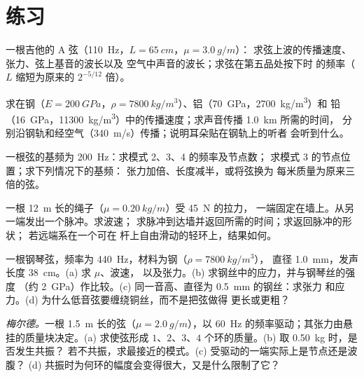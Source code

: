 \section{练习}

\begin{exercise}[$\star$]\label{exo:b2:waves-on-strings:1}
一根吉他的 A 弦（\qty{110}{Hz}，$L = \qty{65}{cm}$，$\mu = \qty{3.0}{g/m}$）：
求弦上波的传播速度、张力、弦上基音的波长以及
空气中声音的波长；求弦在第五品处按下时
的频率（$L$ 缩短为原来的 $2^{-5/12}$ 倍）。
\end{exercise}

\begin{exercise}[$\star$]\label{exo:b2:waves-on-strings:2}
求在钢（$E = \qty{200}{GPa}$，$\rho =
\qty{7800}{kg/m^3}$）、铝（\qty{70}{GPa}，\qty{2700}{kg/m^3}）和
铅（\qty{16}{GPa}，\qty{11300}{kg/m^3}）中的传播速度；求声音传播 \qty{1.0}{km} 所需的时间，
分别沿钢轨和经空气（\qty{340}{m/s}）传播；说明耳朵贴在钢轨上的听者
会听到什么。
\end{exercise}

\begin{exercise}[$\star$]\label{exo:b2:waves-on-strings:3}
一根弦的基频为 \qty{200}{Hz}：求模式 2、3、4 的频率及节点数；
求模式 3 的节点位置；求下列情况下的基频：
张力加倍、长度减半，或将弦换为
每米质量为原来三倍的弦。
\end{exercise}

\begin{exercise}[$\star$]\label{exo:b2:waves-on-strings:4}
一根 \qty{12}{m} 长的绳子（$\mu = \qty{0.20}{kg/m}$）受 \qty{45}{N} 的拉力，
一端固定在墙上。从另一端发出一个脉冲。求波速；
求脉冲到达墙并返回所需的时间；求返回脉冲的形状；
若远端系在一个可在
杆上自由滑动的轻环上，结果如何。
\end{exercise}

\begin{exercise}[$\star\star$]\label{exo:b2:waves-on-strings:5}
一根钢琴弦，频率为 \qty{440}{Hz}，材料为钢（$\rho = \qty{7800}{kg/m^3}$），
直径 \qty{1.0}{mm}，发声长度 \qty{38}{cm}。(a) 求 $\mu$、波速，
以及张力。(b) 求钢丝中的应力，并与钢琴丝的强度
（约 \qty{2}{GPa}）作比较。(c) 同一音高、直径为 \qty{0.5}{mm} 的钢丝：求张力
和应力。(d) 为什么低音弦要缠绕铜丝，而不是把弦做得
更长或更粗？
\end{exercise}

\begin{exercise}[$\star\star$]\label{exo:b2:waves-on-strings:6}
\emph{梅尔德。}一根 \qty{1.5}{m} 长的弦（$\mu = \qty{2.0}{g/m}$），以
\qty{60}{Hz} 的频率驱动；其张力由悬挂的质量块决定。(a) 求使弦形成
$1$、$2$、$3$、$4$ 个环的质量。(b) 取 \qty{0.50}{kg} 时，是否发生共振？
若不共振，求最接近的模式。(c) 受驱动的一端实际上是节点还是波腹？
(d) 共振时为何环的幅度会变得很大，又是什么限制了它？
\end{exercise}

